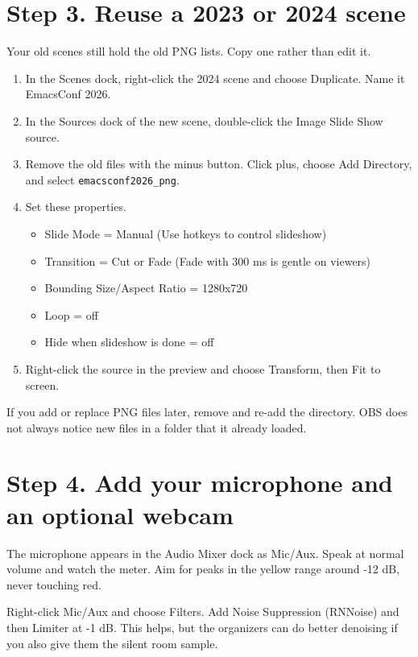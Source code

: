 \documentclass[11pt]{article}
\begin{document}
\section*{Step 3. Reuse a 2023 or 2024 scene}
\label{sec:orgbd6d35b}

Your old scenes still hold the old PNG lists. Copy one rather than edit it.

\begin{enumerate}
\item In the Scenes dock, right-click the 2024 scene and choose Duplicate. Name it EmacsConf 2026.
\item In the Sources dock of the new scene, double-click the Image Slide Show source.
\item Remove the old files with the minus button. Click plus, choose Add Directory, and select \texttt{emacsconf2026\_png}.
\item Set these properties.
\begin{itemize}
\item Slide Mode = Manual (Use hotkeys to control slideshow)
\item Transition = Cut or Fade (Fade with 300 ms is gentle on viewers)
\item Bounding Size/Aspect Ratio = 1280x720
\item Loop = off
\item Hide when slideshow is done = off
\end{itemize}
\item Right-click the source in the preview and choose Transform, then Fit to screen.
\end{enumerate}

If you add or replace PNG files later, remove and re-add the directory.
OBS does not always notice new files in a folder that it already loaded.
\section*{Step 4. Add your microphone and an optional webcam}
\label{sec:orgc1a9952}

The microphone appears in the Audio Mixer dock as Mic/Aux. Speak at normal volume and watch the meter. Aim for peaks in the yellow range around -12 dB, never touching red.

Right-click Mic/Aux and choose Filters. Add Noise Suppression (RNNoise) and then Limiter at -1 dB. This helps, but the organizers can do better denoising if you also give them the silent room sample.
\end{document}
